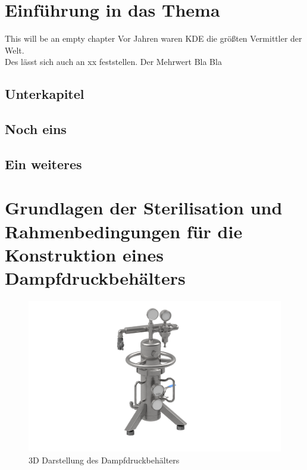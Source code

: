 \documentclass[
    12pt, %
    ngerman, %
    a4paper, %
    oneside, %
    headings=big, %
    listof=totoc, %
    bibliography=totoc, %
    index=totoc, %
    captions=tableheading, %
    final %
    sectionentrydots=true,
    toc = bibliography,
]{scrartcl}
\begin{document}
\cleardoublepage{}



\newpage
{}
\ofoot{\thepage}
\ihead{}
\chead{}
\ohead{}



\section{Einführung in das Thema}

This will be an empty chapter
Vor Jahren waren \ac{KDE} die größten Vermittler der Welt. \\
Des lässt sich auch an xx feststellen. Der Mehrwert Bla Bla \blindtext\par


\blindtext{}

\subsection{Unterkapitel}
\blindtext{}
\subsection{Noch eins}
\subsection{Ein weiteres}

\newpage

\section{Grundlagen der Sterilisation und Rahmenbedingungen für die Konstruktion eines Dampfdruckbehälters}
\blindtext[1]\par\blindtext[1.5]\par

\begin{figure}[htb]
    \centering  
    \includegraphics[keepaspectratio,width=\textwidth,height=\textheight]{render.png}
    \caption{3D Darstellung des Dampfdruckbehälters}\label{fig:render}
\end{figure}
\end{document}
